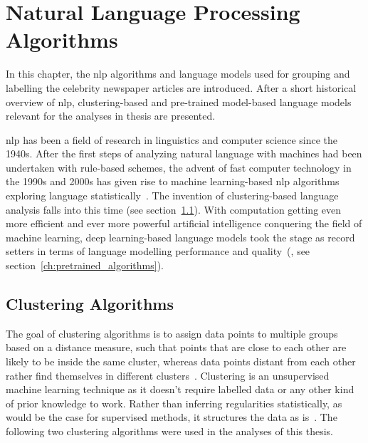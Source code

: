 \renewcommand{\imagepath}{../30-algorithms/img}

\chapter{Natural Language Processing Algorithms}\label{ch:algorithms}
In this chapter, the \gls{nlp} algorithms and language models used for grouping and labelling the celebrity newspaper articles are introduced. After a short historical overview of \gls{nlp}, clustering-based and pre-trained model-based language models relevant for the analyses in thesis are presented.


\gls{nlp} has been a field of research in linguistics and computer science since the 1940s. After the first steps of analyzing natural language with machines had been undertaken with rule-based schemes, the advent of fast computer technology in the 1990s and 2000s has given rise to machine learning-based \gls{nlp} algorithms exploring language statistically~\autocite{jurafsky_speech_2008}. The invention of clustering-based language analysis falls into this time (see section~\ref{ch:clustering_algorithms}). With computation getting even more efficient and ever more powerful artificial intelligence conquering the field of machine learning, deep learning-based language models took the stage as record setters in terms of language modelling performance and quality~(\cite{vajjala_practical_2020}, see section~\ref{ch:pretrained_algorithms}).


\section{Clustering Algorithms}\label{ch:clustering_algorithms}
The goal of clustering algorithms is to assign data points to multiple groups based on a distance measure, such that points that are close to each other are likely to be inside the same cluster, whereas data points distant from each other rather find themselves in different clusters~\autocite{everitt_cluster_2011,jain_algorithms_1988}. Clustering is an unsupervised machine learning technique as it doesn't require labelled data or any other kind of prior knowledge to work. Rather than inferring regularities statistically, as would be the case for supervised methods, it structures the data as is~\autocite{xu_survey_2005}. The following two clustering algorithms were used in the analyses of this thesis.

